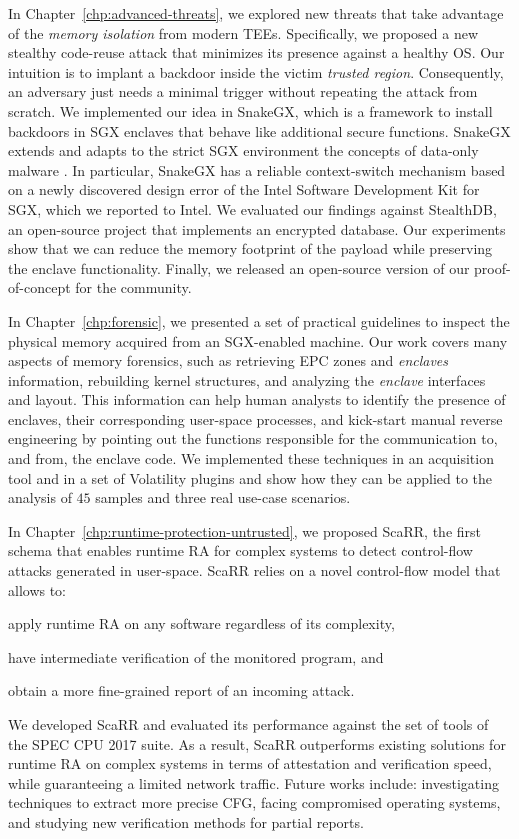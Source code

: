 In Chapter~\ref{chp:advanced-threats}, we explored new threats that take 
advantage of the \emph{memory isolation} from modern TEEs.
Specifically, we proposed a new stealthy code-reuse attack that minimizes 
its presence against a healthy OS.
Our intuition is to implant a backdoor inside the victim \emph{trusted region}.
Consequently, an adversary just needs a minimal trigger without repeating the 
attack from scratch.
We implemented our idea in SnakeGX, which is a framework to install 
backdoors in SGX enclaves that behave like additional secure functions.
SnakeGX extends and adapts to the strict SGX environment the concepts of 
data-only malware \citep{vogl2014persistent}.
In particular, SnakeGX has a reliable context-switch mechanism based 
on a newly discovered design error of the Intel Software Development Kit 
for SGX, which we reported to Intel.
We evaluated our findings against StealthDB, an open-source project that 
implements an encrypted database.
Our experiments show that we can reduce the memory footprint of the payload
while preserving the enclave functionality.
Finally, we released an open-source version of our proof-of-concept for the 
community.

In Chapter~\ref{chp:forensic}, we presented a set of practical guidelines to 
inspect the physical memory acquired from an SGX-enabled machine.
Our work covers many aspects of memory forensics, such as retrieving EPC zones 
and \emph{enclaves} information, rebuilding kernel structures, and analyzing 
the \emph{enclave} interfaces and layout. This information can help 
human analysts to identify the presence of enclaves, their corresponding
user-space processes, and kick-start manual reverse engineering 
by pointing out the functions responsible for the communication to, and from,
the enclave code. 
We implemented these techniques in an acquisition tool and in a set of
Volatility plugins and show how they can be applied to the analysis of $45$
samples and three real use-case scenarios.

In Chapter~\ref{chp:runtime-protection-untrusted}, we proposed ScaRR, the first 
schema that enables runtime RA for complex systems to detect control-flow 
attacks generated in user-space.
ScaRR relies on a novel control-flow model that allows to:
\begin{enumerate*}[label=(\roman*)]
	\item apply runtime RA on any software regardless of its complexity,
	\item have intermediate verification of the monitored program, and
	\item obtain a more fine-grained report of an incoming attack.
\end{enumerate*}
We developed ScaRR and evaluated its performance against the set of tools of 
the SPEC CPU 2017 suite.
As a result, ScaRR outperforms existing solutions for runtime RA on complex 
systems in terms of attestation and verification speed, while guaranteeing a 
limited network traffic.
Future works include: investigating techniques to extract more precise CFG, 
facing compromised operating systems, and studying new verification methods for 
partial reports.

